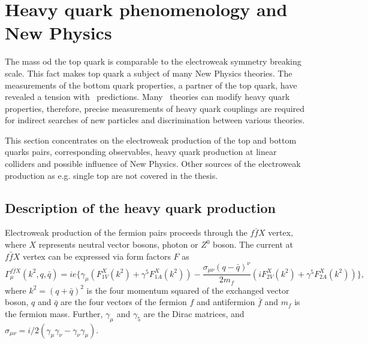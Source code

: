 
\section{Heavy quark phenomenology and New Physics}
The mass od the top quark is comparable to the electroweak symmetry breaking scale. 
This fact makes top quark a subject of many New Physics theories. 
The measurements of the bottom quark properties, a partner of the top quark, have revealed a tension with \sm\ predictions. 
Many \bsm\ theories can modify heavy quark properties, therefore, precise measurements of heavy quark couplings are required for indirect searches of new particles and discrimination between various theories. 

This section concentrates on the electroweak production of the top and bottom quarks pairs, corresponding observables, heavy quark production at linear colliders and possible influence of New Physics.
Other sources of the electroweak production as e.g. single top are not covered in the thesis. 


\subsection{Description of the heavy quark production}
Electroweak production of the fermion pairs proceeds through the $f\bar{f}X$ vertex, where $X$ represents neutral vector bosons, photon or $Z^0$ boson.  The current at $f\bar{f}X$ vertex can be expressed via form factors $F$ as 
\begin{equation}
\Gamma^{f\bar{f}X}_\mu (k^2,q,\bar{q}) = ie\{ \gamma_\mu (F^X_{1V}(k^2) + \gamma^5 F^X_{1A}(k^2)) - \frac{\sigma_{\mu\nu}(q-\bar{q})^\nu}{2m_f}(iF^X_{2V}(k^2) + \gamma^5 F^X_{2A}(k^2)) \},
\end{equation}
where $k^2= (q+\bar{q})^2$ is the four momentum squared of the exchanged vector boson, $q$ and $\bar{q}$ are the four vectors of the fermion $f$ and antifermion $\bar{f}$ and $m_f$ is the fermion mass. Further, $\gamma_\mu$ and $\gamma_5$ are the Dirac matrices, and $\sigma_{\mu\nu} = i/2(\gamma_\mu\gamma_\nu - \gamma_\nu\gamma_\mu)$.

